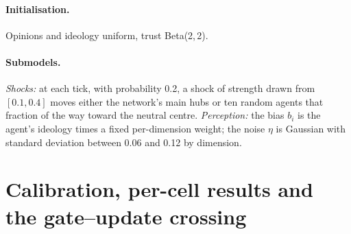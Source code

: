 \documentclass[11pt]{article}
\begin{document}
\paragraph{Initialisation.} Opinions and ideology uniform, trust Beta(2,\,2).

\paragraph{Submodels.} \emph{Shocks:} at each tick, with probability 0.2, a shock of strength drawn from $[0.1,0.4]$ moves either the network's main hubs or ten random agents that fraction of the way toward the neutral centre. \emph{Perception:} the bias $b_i$ is the agent's ideology times a fixed per-dimension weight; the noise $\eta$ is Gaussian with standard deviation between 0.06 and 0.12 by dimension.

\section{Calibration, per-cell results and the gate--update crossing}
\label{app:tables}

\begin{table}[h]
\centering\scriptsize
\caption{Run-matched thresholds: the $\varepsilon$ found by bisection (3 significant figures), its pass-rate error against the Euclidean target on the 50 pilot seeds, the number of bisection steps, and the pass-rate gap to Euclidean on the 100 evaluation seeds with a paired bootstrap 95\% interval; $^\dagger$ marks a gap not equivalent to zero ($\pm0.02$).}
\label{tab:calibration}

\end{table}

\begin{table}[h]
\centering\scriptsize
\caption{Pass-rate gap to Euclidean after 2{,}000 rounds, per cell, geometry and threshold rule: mean difference [paired bootstrap 95\% CI]; $^{=}$ marks equivalence to zero ($\pm0.02$).}
\label{tab:cells-pass}

\end{table}

\begin{table}[h]
\centering\scriptsize
\caption{Gap to Euclidean in the primary outcome (groups holding at least 1\% of agents, common ruler) after 2{,}000 rounds: mean $\log_2$ ratio [paired bootstrap 95\% CI]; $^{=}$ marks equivalence to zero ($\pm0.25$).}
\label{tab:cells-groups}

\end{table}
\end{document}
